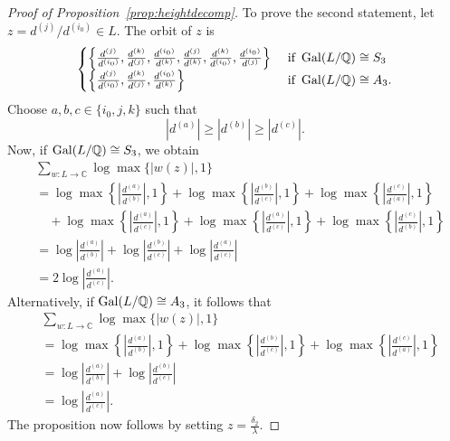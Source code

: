 \begin{proof}[Proof of Proposition~\ref{prop:heightdecomp}]
To prove the second statement, let $z = d^{(j)}/d^{(i_0)} \in L$. The orbit of $z$ is
\[\begin{cases}
\left\{\frac{d^{(j)}}{d^{(i_0)}}, \frac{d^{(k)}}{d^{(j)}}, \frac{d^{(i_0)}}{d^{(k)}}, \frac{d^{(j)}}{d^{(k)}}, \frac{d^{(k)}}{d^{(i_0)}}, \frac{d^{(i_0)}}{d^{(j)}} \right\} & \text{ if } \operatorname{Gal}(L/\mathbb{Q}) \cong S_3\\
\left\{\frac{d^{(j)}}{d^{(i_0)}}, \frac{d^{(k)}}{d^{(j)}}, \frac{d^{(i_0)}}{d^{(k)}}\right\} & \text{ if } \operatorname{Gal}(L/\mathbb{Q}) \cong A_3.
\end{cases}\]
Choose $a,b,c\in\{i_0,j,k\}$ such that 
\[|d^{(a)}| \geq |d^{(b)}| \geq |d^{(c)}|.\]
Now, if $\operatorname{Gal}(L/\mathbb{Q}) \cong S_3$, we obtain
\begin{align*}
& \sum_{w :L \to \mathbb{C}} \log \max \{ |w(z)|, 1\} \\
	& = \log \max \left\{ \left|\frac{d^{(a)}}{d^{(b)}}\right|, 1\right\} + \log \max \left\{ \left|\frac{d^{(b)}}{d^{(c)}}\right|, 1\right\} + \log \max \left\{ \left|\frac{d^{(c)}}{d^{(a)}}\right|, 1\right\} \\
	& \quad +  \log \max \left\{ \left|\frac{d^{(a)}}{d^{(c)}}\right|, 1\right\} + \log \max \left\{ \left|\frac{d^{(a)}}{d^{(c)}}\right|, 1\right\} + \log \max \left\{ \left|\frac{d^{(c)}}{d^{(b)}}\right|, 1\right\}\\
	& = \log \left|\frac{d^{(a)}}{d^{(b)}}\right| + \log \left|\frac{d^{(b)}}{d^{(c)}}\right| + \log \left|\frac{d^{(a)}}{d^{(c)}}\right| \\
	& = 2\log \left|\frac{d^{(a)}}{d^{(c)}}\right|.
\end{align*}
Alternatively, if $\operatorname{Gal}(L/\mathbb{Q}) \cong A_3$, it follows that
\begin{align*}
& \sum_{w :L \to \mathbb{C}} \log \max \{ |w(z)|, 1\} \\
	& = \log \max \left\{ \left|\frac{d^{(a)}}{d^{(b)}}\right|, 1\right\} + \log \max \left\{ \left|\frac{d^{(b)}}{d^{(c)}}\right|, 1\right\} + \log \max \left\{ \left|\frac{d^{(c)}}{d^{(a)}}\right|, 1\right\} \\
	& = \log \left|\frac{d^{(a)}}{d^{(b)}}\right| + \log \left|\frac{d^{(b)}}{d^{(c)}}\right| \\
	& = \log \left|\frac{d^{(a)}}{d^{(c)}}\right|.
\end{align*}
The proposition now follows by setting $z = \frac{\delta_2}{\lambda}$. 
\end{proof}

